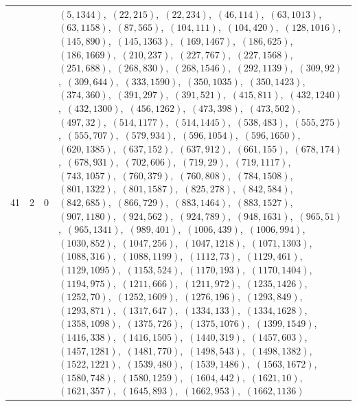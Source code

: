 \documentclass[11pt]{article}
\begin{document}
\begin{longtable}{@{}rrl>{\raggedright\arraybackslash}p{}@{}}
41 & 2 & $0$ & $(5,1344)$,\allowbreak\ $(22,215)$,\allowbreak\ $(22,234)$,\allowbreak\ $(46,114)$,\allowbreak\ $(63,1013)$,\allowbreak\ $(63,1158)$,\allowbreak\ $(87,565)$,\allowbreak\ $(104,111)$,\allowbreak\ $(104,420)$,\allowbreak\ $(128,1016)$,\allowbreak\ $(145,890)$,\allowbreak\ $(145,1363)$,\allowbreak\ $(169,1467)$,\allowbreak\ $(186,625)$,\allowbreak\ $(186,1669)$,\allowbreak\ $(210,237)$,\allowbreak\ $(227,767)$,\allowbreak\ $(227,1568)$,\allowbreak\ $(251,688)$,\allowbreak\ $(268,830)$,\allowbreak\ $(268,1546)$,\allowbreak\ $(292,1139)$,\allowbreak\ $(309,92)$,\allowbreak\ $(309,644)$,\allowbreak\ $(333,1590)$,\allowbreak\ $(350,1035)$,\allowbreak\ $(350,1423)$,\allowbreak\ $(374,360)$,\allowbreak\ $(391,297)$,\allowbreak\ $(391,521)$,\allowbreak\ $(415,811)$,\allowbreak\ $(432,1240)$,\allowbreak\ $(432,1300)$,\allowbreak\ $(456,1262)$,\allowbreak\ $(473,398)$,\allowbreak\ $(473,502)$,\allowbreak\ $(497,32)$,\allowbreak\ $(514,1177)$,\allowbreak\ $(514,1445)$,\allowbreak\ $(538,483)$,\allowbreak\ $(555,275)$,\allowbreak\ $(555,707)$,\allowbreak\ $(579,934)$,\allowbreak\ $(596,1054)$,\allowbreak\ $(596,1650)$,\allowbreak\ $(620,1385)$,\allowbreak\ $(637,152)$,\allowbreak\ $(637,912)$,\allowbreak\ $(661,155)$,\allowbreak\ $(678,174)$,\allowbreak\ $(678,931)$,\allowbreak\ $(702,606)$,\allowbreak\ $(719,29)$,\allowbreak\ $(719,1117)$,\allowbreak\ $(743,1057)$,\allowbreak\ $(760,379)$,\allowbreak\ $(760,808)$,\allowbreak\ $(784,1508)$,\allowbreak\ $(801,1322)$,\allowbreak\ $(801,1587)$,\allowbreak\ $(825,278)$,\allowbreak\ $(842,584)$,\allowbreak\ $(842,685)$,\allowbreak\ $(866,729)$,\allowbreak\ $(883,1464)$,\allowbreak\ $(883,1527)$,\allowbreak\ $(907,1180)$,\allowbreak\ $(924,562)$,\allowbreak\ $(924,789)$,\allowbreak\ $(948,1631)$,\allowbreak\ $(965,51)$,\allowbreak\ $(965,1341)$,\allowbreak\ $(989,401)$,\allowbreak\ $(1006,439)$,\allowbreak\ $(1006,994)$,\allowbreak\ $(1030,852)$,\allowbreak\ $(1047,256)$,\allowbreak\ $(1047,1218)$,\allowbreak\ $(1071,1303)$,\allowbreak\ $(1088,316)$,\allowbreak\ $(1088,1199)$,\allowbreak\ $(1112,73)$,\allowbreak\ $(1129,461)$,\allowbreak\ $(1129,1095)$,\allowbreak\ $(1153,524)$,\allowbreak\ $(1170,193)$,\allowbreak\ $(1170,1404)$,\allowbreak\ $(1194,975)$,\allowbreak\ $(1211,666)$,\allowbreak\ $(1211,972)$,\allowbreak\ $(1235,1426)$,\allowbreak\ $(1252,70)$,\allowbreak\ $(1252,1609)$,\allowbreak\ $(1276,196)$,\allowbreak\ $(1293,849)$,\allowbreak\ $(1293,871)$,\allowbreak\ $(1317,647)$,\allowbreak\ $(1334,133)$,\allowbreak\ $(1334,1628)$,\allowbreak\ $(1358,1098)$,\allowbreak\ $(1375,726)$,\allowbreak\ $(1375,1076)$,\allowbreak\ $(1399,1549)$,\allowbreak\ $(1416,338)$,\allowbreak\ $(1416,1505)$,\allowbreak\ $(1440,319)$,\allowbreak\ $(1457,603)$,\allowbreak\ $(1457,1281)$,\allowbreak\ $(1481,770)$,\allowbreak\ $(1498,543)$,\allowbreak\ $(1498,1382)$,\allowbreak\ $(1522,1221)$,\allowbreak\ $(1539,480)$,\allowbreak\ $(1539,1486)$,\allowbreak\ $(1563,1672)$,\allowbreak\ $(1580,748)$,\allowbreak\ $(1580,1259)$,\allowbreak\ $(1604,442)$,\allowbreak\ $(1621,10)$,\allowbreak\ $(1621,357)$,\allowbreak\ $(1645,893)$,\allowbreak\ $(1662,953)$,\allowbreak\ $(1662,1136)$\\

\end{longtable}
\end{document}
